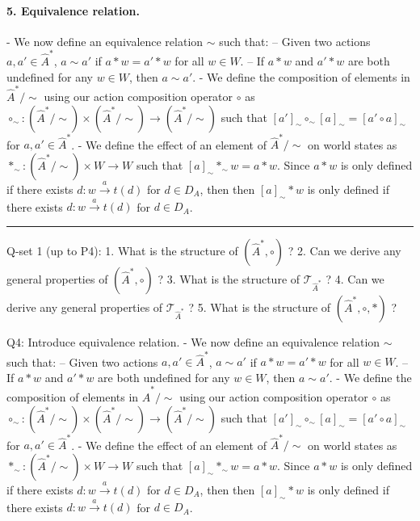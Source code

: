 \paragraph{5. Equivalence relation.}
- We now define an equivalence relation $\sim$ such that:
    -- Given two actions $a, a' \in \hat{A}^{\ast}$, $a \sim a'$ if $a \ast w = a' \ast w$ for all $w \in W$.
    -- If $a \ast w$ and $a' \ast w$ are both undefined for any $w \in W$, then $a \sim a'$.
- We define the composition of elements in $\hat{A}^{\ast}/\sim$ using our action composition operator $\circ$ as $\circ_{\sim}: (\hat{A}^{\ast}/\sim) \times (\hat{A}^{\ast}/\sim) \to (\hat{A}^{\ast}/\sim)$ such that $[a']_{\sim} \circ_{\sim} [a]_{\sim} = [a' \circ a]_{\sim}$ for $a,a' \in \hat{A}^{\ast}$.
- We define the effect of an element of  $\hat{A}^{\ast}/\sim$ on world states as $\ast_{\sim}: (\hat{A}^{\ast}/\sim) \times W \to W$ such that $[a]_{\sim} \ast_{\sim} w = a \ast w$.
Since $a \ast w$ is only defined if there exists $d: w \xrightarrow{a} t(d)$ for $d \in D_{A}$, then  then $[a]_{\sim} \ast w$ is only defined if there exists $d: w \xrightarrow{a} t(d)$ for $d \in D_{A}$.



\noindent\rule{\textwidth}{1mm}

Q-set 1 (up to P4):
1. What is the structure of $(\hat{A}^{\ast}, \circ)$ ?
2. Can we derive any general properties of $(\hat{A}^{\ast}, \circ)$ ?
3. What is the structure of $\mathcal{T}_{\hat{A}^{\ast}}$ ?
4. Can we derive any general properties of $\mathcal{T}_{\hat{A}^{\ast}}$ ?
5. What is the structure of $(\hat{A}^{\ast}, \circ, \ast)$ ?



Q4: Introduce equivalence relation.
- We now define an equivalence relation $\sim$ such that:
    -- Given two actions $a, a' \in \hat{A}^{\ast}$, $a \sim a'$ if $a \ast w = a' \ast w$ for all $w \in W$.
    -- If $a \ast w$ and $a' \ast w$ are both undefined for any $w \in W$, then $a \sim a'$.
- We define the composition of elements in $\hat{A}^{\ast}/\sim$ using our action composition operator $\circ$ as $\circ_{\sim}: (\hat{A}^{\ast}/\sim) \times (\hat{A}^{\ast}/\sim) \to (\hat{A}^{\ast}/\sim)$ such that $[a']_{\sim} \circ_{\sim} [a]_{\sim} = [a' \circ a]_{\sim}$ for $a,a' \in \hat{A}^{\ast}$.
- We define the effect of an element of  $\hat{A}^{\ast}/\sim$ on world states as $\ast_{\sim}: (\hat{A}^{\ast}/\sim) \times W \to W$ such that $[a]_{\sim} \ast_{\sim} w = a \ast w$.
Since $a \ast w$ is only defined if there exists $d: w \xrightarrow{a} t(d)$ for $d \in D_{A}$, then  then $[a]_{\sim} \ast w$ is only defined if there exists $d: w \xrightarrow{a} t(d)$ for $d \in D_{A}$.

